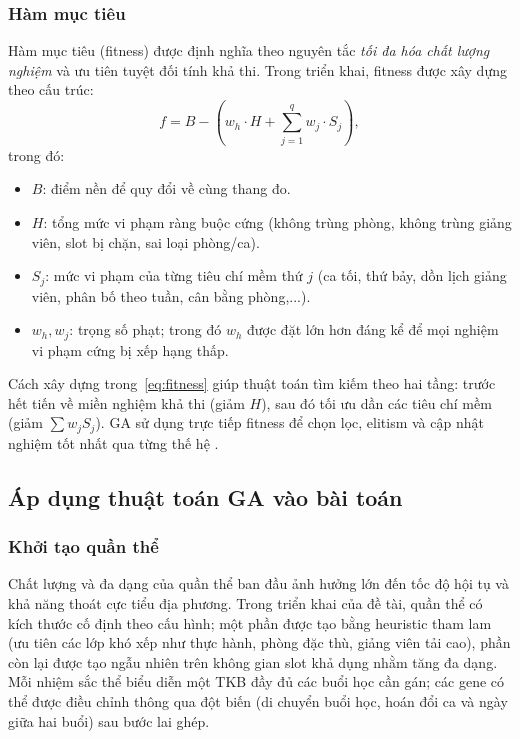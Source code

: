 \documentclass[a4paper,12pt,oneside]{article}
\begin{document}
	\subsubsection{Hàm mục tiêu}
	
	Hàm mục tiêu (fitness) được định nghĩa theo nguyên tắc \textit{tối đa hóa chất lượng nghiệm} và ưu tiên tuyệt đối tính khả thi. Trong triển khai, fitness được xây dựng theo cấu trúc:
	\begin{equation}
		\label{eq:fitness}
		f = B - \left( w_h \cdot H + \sum_{j=1}^{q} w_j \cdot S_j \right),
	\end{equation}
	trong đó:
	\begin{itemize}
		\item \textit{$B$}: điểm nền để quy đổi về cùng thang đo.
		\item \textit{$H$}: tổng mức vi phạm ràng buộc cứng (không trùng phòng, không trùng giảng viên, slot bị chặn, sai loại phòng/ca).
		\item \textit{$S_j$}: mức vi phạm của từng tiêu chí mềm thứ $j$ (ca tối, thứ bảy, dồn lịch giảng viên, phân bố theo tuần, cân bằng phòng,...).
		\item \textit{$w_h, w_j$}: trọng số phạt; trong đó $w_h$ được đặt lớn hơn đáng kể để mọi nghiệm vi phạm cứng bị xếp hạng thấp.
	\end{itemize}
	
	Cách xây dựng trong~\eqref{eq:fitness} giúp thuật toán tìm kiếm theo hai tầng: trước hết tiến về miền nghiệm khả thi (giảm $H$), sau đó tối ưu dần các tiêu chí mềm (giảm $\sum w_j S_j$). GA sử dụng trực tiếp fitness để chọn lọc, elitism và cập nhật nghiệm tốt nhất qua từng thế hệ \cite{burke1997automated,eiben2015introduction}.
	
	\subsection{Áp dụng thuật toán GA vào bài toán}
	
	\subsubsection{Khởi tạo quần thể}
	
	Chất lượng và đa dạng của quần thể ban đầu ảnh hưởng lớn đến tốc độ hội tụ và khả năng thoát cực tiểu địa phương. Trong triển khai của đề tài, quần thể có kích thước cố định theo cấu hình; một phần được tạo bằng heuristic tham lam (ưu tiên các lớp khó xếp như thực hành, phòng đặc thù, giảng viên tải cao), phần còn lại được tạo ngẫu nhiên trên không gian slot khả dụng nhằm tăng đa dạng. Mỗi nhiệm sắc thể biểu diễn một TKB đầy đủ các buổi học cần gán; các gene có thể được điều chỉnh thông qua đột biến (di chuyển buổi học, hoán đổi ca và ngày giữa hai buổi) sau bước lai ghép.
	
\end{document}
